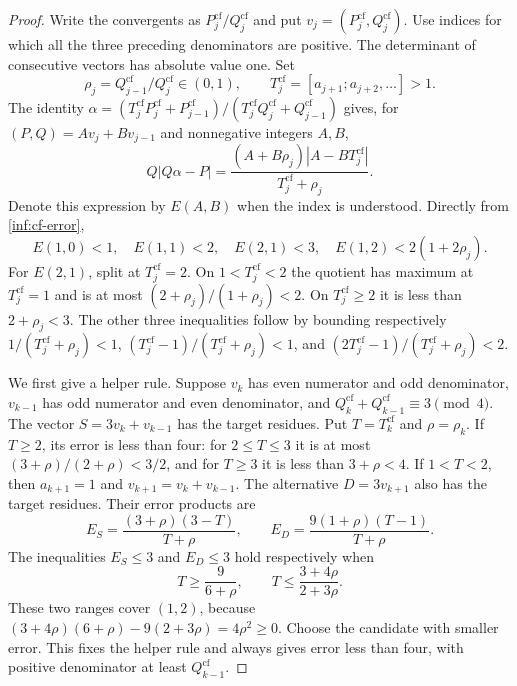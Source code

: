 \begin{proof}
Write the convergents as $P_j^{\mathrm{cf}}/Q_j^{\mathrm{cf}}$ and put $v_j=(P_j^{\mathrm{cf}},Q_j^{\mathrm{cf}})$.
Use indices for which all the three preceding denominators are positive.
The determinant of consecutive vectors has absolute value one. Set
\[
 \rho_j=Q_{j-1}^{\mathrm{cf}}/Q_j^{\mathrm{cf}}\in(0,1),\qquad
 T_j^{\mathrm{cf}}=[a_{j+1};a_{j+2},\ldots]>1.
\]
The identity
$\alpha=(T_j^{\mathrm{cf}}P_j^{\mathrm{cf}}+P_{j-1}^{\mathrm{cf}})/(T_j^{\mathrm{cf}}Q_j^{\mathrm{cf}}+Q_{j-1}^{\mathrm{cf}})$ gives, for
$(P,Q)=Av_j+Bv_{j-1}$ and nonnegative integers $A,B$,
\begin{equation}\label{inf:cf-error}
 Q|Q\alpha-P|=\frac{(A+B\rho_j)|A-BT_j^{\mathrm{cf}}|}{T_j^{\mathrm{cf}}+\rho_j}.
\end{equation}
Denote this expression by $E(A,B)$ when the index is understood.
Directly from \eqref{inf:cf-error},
\begin{equation}\label{inf:cf-basic-bounds}
 E(1,0)<1,\quad E(1,1)<2,\quad E(2,1)<3,
 \quad E(1,2)<2(1+2\rho_j).
\end{equation}
For $E(2,1)$, split at $T_j^{\mathrm{cf}}=2$. On $1<T_j^{\mathrm{cf}}<2$ the quotient has
maximum at $T_j^{\mathrm{cf}}=1$ and is at most $(2+\rho_j)/(1+\rho_j)<2$.
On $T_j^{\mathrm{cf}}\ge2$ it is less than $2+\rho_j<3$.
The other three inequalities follow by bounding respectively
$1/(T_j^{\mathrm{cf}}+\rho_j)<1$, $(T_j^{\mathrm{cf}}-1)/(T_j^{\mathrm{cf}}+\rho_j)<1$, and
$(2T_j^{\mathrm{cf}}-1)/(T_j^{\mathrm{cf}}+\rho_j)<2$.

We first give a helper rule. Suppose $v_k$ has even numerator and odd
denominator, $v_{k-1}$ has odd numerator and even denominator, and
$Q_k^{\mathrm{cf}}+Q_{k-1}^{\mathrm{cf}}\equiv3\pmod4$. The vector
$S=3v_k+v_{k-1}$ has the target residues. Put $T=T_k^{\mathrm{cf}}$ and
$\rho=\rho_k$. If $T\ge2$, its error is less than four: for
$2\le T\le3$ it is at most $(3+\rho)/(2+\rho)<3/2$, and for
$T\ge3$ it is less than $3+\rho<4$.
If $1<T<2$, then $a_{k+1}=1$ and $v_{k+1}=v_k+v_{k-1}$.
The alternative $D=3v_{k+1}$ also has the target residues. Their
error products are
\[
 E_S=\frac{(3+\rho)(3-T)}{T+\rho},\qquad
 E_D=\frac{9(1+\rho)(T-1)}{T+\rho}.
\]
The inequalities $E_S\le3$ and $E_D\le3$ hold respectively when
\[
 T\ge\frac9{6+\rho},\qquad
 T\le\frac{3+4\rho}{2+3\rho}.
\]
These two ranges cover $(1,2)$, because
$(3+4\rho)(6+\rho)-9(2+3\rho)=4\rho^2\ge0$.
Choose the candidate with smaller error. This fixes the helper rule
and always gives error less than four, with positive denominator at
least $Q_{k-1}^{\mathrm{cf}}$.


\end{proof}
